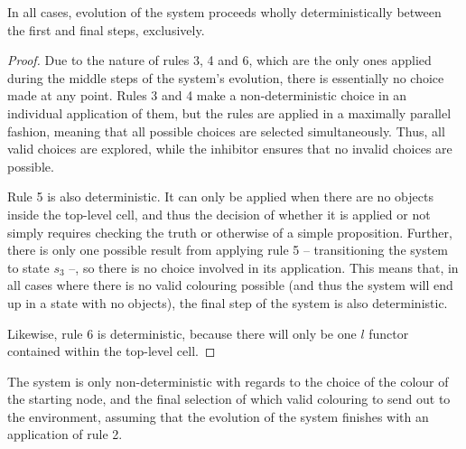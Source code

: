\begin{proposition}\label{prop:determin}
In all cases, evolution of the system proceeds wholly deterministically between the first and final steps, exclusively.
\end{proposition}

\begin{proof}
Due to the nature of rules 3, 4 and 6, which are the only ones applied during the middle steps of the system's evolution, there is essentially no choice made at any point.  Rules 3 and 4 make a non-deterministic choice in an individual application of them, but the rules are applied in a maximally parallel fashion, meaning that all possible choices are selected simultaneously.  Thus, all valid choices are explored, while the inhibitor ensures that no invalid choices are possible.

Rule 5 is also deterministic.  It can only be applied when there are no \bo{} objects inside the top-level cell, and thus the decision of whether it is applied or not simply requires checking the truth or otherwise of a simple proposition.  Further, there is only one possible result from applying rule 5 -- transitioning the system to state \(s_3\) --, so there is no choice involved in its application.  This means that, in all cases where there is no valid colouring possible (and thus the system will end up in a state with no \bo{} objects), the final step of the system is also deterministic.

Likewise, rule 6 is deterministic, because there will only be one \(l\) functor contained within the top-level cell.
\end{proof}

\begin{proposition}\label{prop:nondet}
The system is only non-deterministic with regards to the choice of the colour of the starting node, and the final selection of which valid colouring to send out to the environment, assuming that the evolution of the system finishes with an application of rule 2.
\end{proposition}

